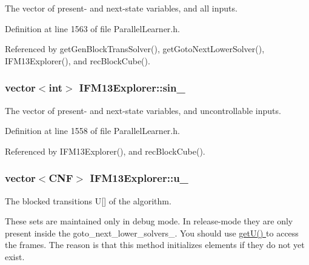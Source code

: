 The vector of present-\/ and next-\/state variables, and all inputs. 



Definition at line 1563 of file Parallel\-Learner.\-h.



Referenced by get\-Gen\-Block\-Trans\-Solver(), get\-Goto\-Next\-Lower\-Solver(), I\-F\-M13\-Explorer(), and rec\-Block\-Cube().

\hypertarget{classIFM13Explorer_a972f36d23d8990dde764f4ee877620fa}{
\subsubsection[{sin\-\_\-}]{\setlength{\rightskip}{0pt plus 5cm}vector$<$int$>$ I\-F\-M13\-Explorer\-::sin\-\_\-\hspace{0.3cm}{\ttfamily [protected]}}}\label{classIFM13Explorer_a972f36d23d8990dde764f4ee877620fa}


The vector of present-\/ and next-\/state variables, and uncontrollable inputs. 



Definition at line 1558 of file Parallel\-Learner.\-h.



Referenced by I\-F\-M13\-Explorer(), and rec\-Block\-Cube().

\hypertarget{classIFM13Explorer_a1f8ea34a97c568894a23a7361339f9ec}{
\subsubsection[{u\-\_\-}]{\setlength{\rightskip}{0pt plus 5cm}vector$<${\bf C\-N\-F}$>$ I\-F\-M13\-Explorer\-::u\-\_\-\hspace{0.3cm}{\ttfamily [protected]}}}\label{classIFM13Explorer_a1f8ea34a97c568894a23a7361339f9ec}


The blocked transitions U\mbox{[}\mbox{]} of the algorithm. 

These sets are maintained only in debug mode. In release-\/mode they are only present inside the goto\-\_\-next\-\_\-lower\-\_\-solvers\-\_\-. You should use \hyperlink{classIFM13Explorer_a2816b4c9f2cb02958e660a872f43fe4b}{get\-U() } to access the frames. The reason is that this method initializes elements if they do not yet exist. 


